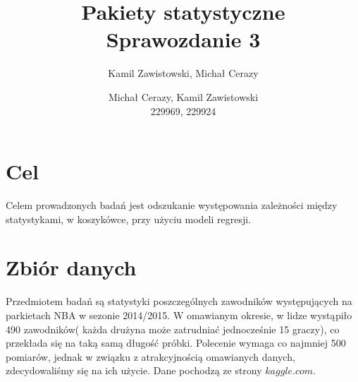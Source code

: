 \documentclass[11pt,a4paper]{article}
\author{Kamil Zawistowski, Michał Cerazy}
\begin{document}
\title{Pakiety statystyczne \\ Sprawozdanie 3}
\author{Michał Cerazy, Kamil Zawistowski \\ 229969, 229924}
\maketitle
\newpage
\tableofcontents
\newpage
\section{Cel}
Celem prowadzonych badań jest odszukanie występowania zależności między statystykami, w koszykówce, przy użyciu modeli regresji. 

\section{Zbiór danych}
Przedmiotem badań są statystyki poszczególnych zawodników występujących na parkietach NBA w sezonie 2014/2015. W omawianym okresie, w lidze wystąpiło 490 zawodników( każda drużyna może zatrudniać jednocześnie 15 graczy), co przekłada się na taką samą długość próbki. Polecenie wymaga co najmniej 500 pomiarów, jednak w związku z atrakcyjnością omawianych danych, zdecydowaliśmy się na ich użycie. Dane pochodzą ze strony $kaggle.com$. 
\end{document}
